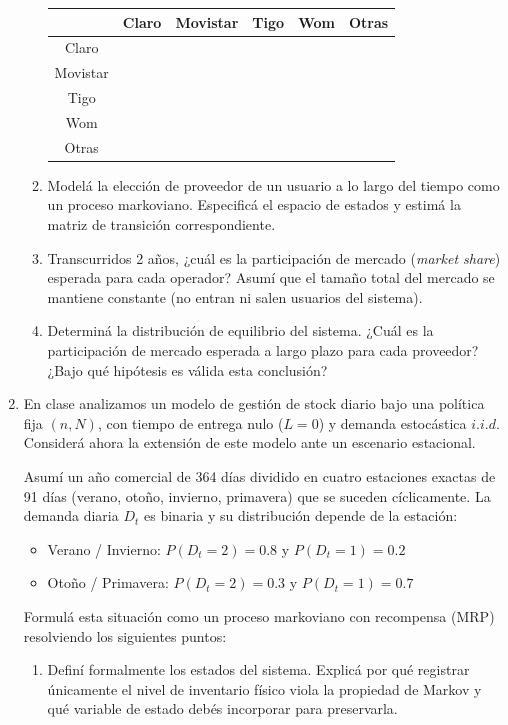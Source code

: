 \documentclass[12pt]{article}
\begin{document}
\begin{enumerate}
\begin{enumerate}
\begin{tabular}{|c|c|c|c|c|c|}
\hline
& Claro & Movistar & Tigo & Wom & Otras \\
\hline
Claro & & & & & \\
\hline
Movistar & & & & & \\
\hline 
Tigo & & & & & \\
\hline 
Wom & & & & & \\
\hline
Otras & & & & & \\
\hline
\end{tabular}
\item Modelá la elección de proveedor de un usuario a lo largo del tiempo como un proceso markoviano. Especificá  el espacio de estados y estimá la matriz de transición correspondiente.
\item Transcurridos 2 años, ¿cuál es la participación de mercado (\textit{market share}) esperada para cada operador? Asumí que el tamaño total del mercado se mantiene constante (no entran ni salen usuarios del sistema).
\item Determiná la distribución de equilibrio del sistema. ¿Cuál es la participación de mercado esperada a largo plazo para cada proveedor? ¿Bajo qué hipótesis es válida esta conclusión?
\end{enumerate}
\item En clase analizamos un modelo de gestión de stock diario bajo una política fija $(n, N)$, con tiempo de entrega nulo ($L=0$) y demanda estocástica $i.i.d.$ Considerá ahora la extensión de este modelo ante un escenario estacional.

Asumí un año comercial de 364 días dividido en cuatro estaciones exactas de 91 días (verano, otoño, invierno, primavera) que se suceden cíclicamente. La demanda diaria $D_t$ es binaria y su distribución depende de la estación:
\begin{itemize}
    \item Verano / Invierno: $P(D_t = 2) = 0.8$ y $P(D_t = 1) = 0.2$
    \item Otoño / Primavera: $P(D_t = 2) = 0.3$ y $P(D_t = 1) = 0.7$
\end{itemize}

Formulá esta situación como un proceso markoviano con recompensa (MRP) resolviendo los siguientes puntos:

\begin{enumerate}
    \item Definí formalmente los estados del sistema. Explicá por qué registrar únicamente el nivel de inventario físico viola la propiedad de Markov y qué variable de estado debés incorporar para preservarla.
    

\end{enumerate}
\end{enumerate}
\end{document}
